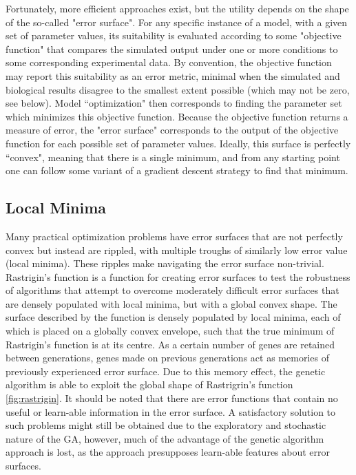 Fortunately, more efficient approaches exist, but the utility depends on the shape of the so-called "error surface".
For any specific instance of a model, with a given set of parameter values, its suitability is evaluated according to some "objective function" that compares the simulated output under one or more conditions to some corresponding experimental data.
By convention, the objective function may report this suitability as an error metric, minimal when the simulated and biological results disagree to the smallest extent possible (which may not be zero, see below).
Model ``optimization" then corresponds to finding the parameter set which minimizes this objective function. 
Because the objective function returns a measure of error, the "error surface" corresponds to the output of the objective function for each possible set of parameter values.
Ideally, this surface is perfectly ``convex", meaning that there is a single minimum, and from any starting point one can follow some variant of a gradient descent strategy to find that minimum.  

\subsection{Local Minima} Many practical optimization problems have error surfaces that are not perfectly convex but instead are rippled, with multiple troughs of similarly low error value (local minima).
These ripples make navigating the error surface non-trivial.
Rastrigin's function \citep{rastrigin1974systems}  is a function for creating error surfaces to test the robustness of algorithms that attempt to overcome moderately difficult error surfaces that are densely populated with local minima, but with a global convex shape.
The surface described by the function is densely populated by local minima, each of which is placed on a globally convex envelope, such that the true minimum of Rastrigin's function is at its centre. As a certain number of genes are retained between generations, genes made on previous generations act as memories of previously experienced error surface. Due to this memory effect, the genetic algorithm is able to exploit the global shape of Rastrigrin's function \ref{fig:rastrigin}. It should be noted that there are error functions that contain no useful or learn-able information in the error surface. A satisfactory solution to such problems might still be obtained due to the exploratory and stochastic nature of the GA, however, much of the advantage of the genetic algorithm approach is lost, as the approach presupposes learn-able features about error surfaces. 

